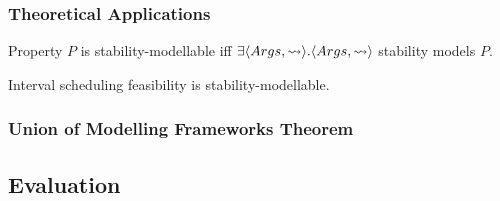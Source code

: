 \documentclass[11pt]{beamer}
\begin{document}
	\begin{frame}
		\frametitle{Theoretical Applications}
		\begin{definition}
			Property $P$ is stability-modellable iff $\exists\langle{Args},{\rightsquigarrow}\rangle.\langle{Args},{\rightsquigarrow}\rangle$ stability models $P$.
		\end{definition}
		\begin{theorem}
			\textnormal{Interval scheduling feasibility is stability-modellable.}
		\end{theorem}
	\end{frame}

	\begin{frame}
		\frametitle{Union of Modelling Frameworks Theorem}
		\begin{center}
			\resizebox{0.9\textwidth}{!}{}		
		\end{center}
	\end{frame}

	\subsection{Evaluation}
\end{document}
